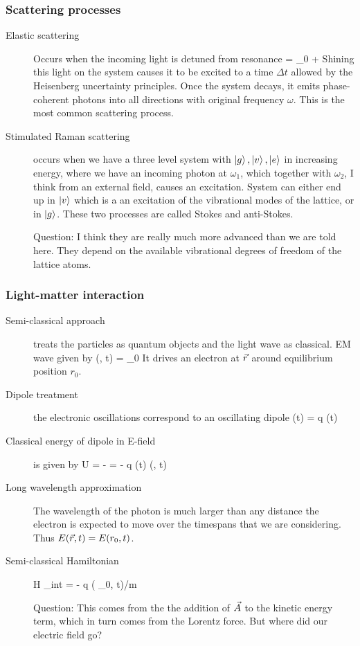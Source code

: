 \subsubsection{Scattering processes}
\begin{description}
\item[Elastic scattering] Occurs when the incoming light is detuned from resonance
\beq
\omega = \omega_0 + \Delta
\eeq
Shining this light on the system causes it to be excited to a time $\Delta t$ allowed by the Heisenberg uncertainty principles. Once the system decays, it emits phase-coherent photons into all directions with original frequency $\omega$. This is the most common scattering process. 

\item[Stimulated Raman scattering] occurs when we have a three level system with $\left| g \right\rangle, \left| v \right\rangle, \left| e \right\rangle$ in increasing energy, where we have an incoming photon at $\omega_1$, which together with $\omega_2$, I think from an external field, causes an excitation. System can either end up in $\left| v \right\rangle$ which is a an excitation of the vibrational modes of the lattice, or in $\left| g \right\rangle$. These two processes are called Stokes and anti-Stokes. 

Question: I think they are really much more advanced than we are told here. They depend on the available vibrational degrees of freedom of the lattice atoms. 

\end{description}

\subsubsection{Light-matter interaction}
\begin{description}
\item[Semi-classical approach] treats the particles as quantum objects and the light wave as classical. EM wave given by 
\beq
{}(, t) = _0 
\eeq
It drives an electron at $\vec{r}$ around equilibrium position $r_0$. 

\item[Dipole treatment] the electronic oscillations correspond to an oscillating dipole
\beq
{}(t) = q (t)
\eeq


\item[Classical energy of dipole in E-field] is given by 
\beq
U = -  \cdot {} = - q (t) \cdot {}(, t)
\eeq

\item[Long wavelength approximation] The wavelength of the photon is much larger than any distance the electron is expected to move over the timespans that we are considering. Thus $E(\vec{r}, t)= E(r_0, t)$. 

\item[Semi-classical Hamiltonian] 
\beq
H _{int} = - q  \cdot {}( _0, t)/m
\eeq

Question: This comes from the the addition of $\vec{A}$ to the kinetic energy term, which in turn comes from the Lorentz force. But where did our electric field go? 

\end{description}

